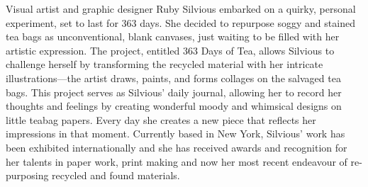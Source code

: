 Visual artist and graphic designer Ruby Silvious embarked on a quirky, personal experiment, set to last for 363 days. She decided to repurpose soggy and stained tea bags as unconventional, blank canvases, just waiting to be filled with her artistic expression. The project, entitled 363 Days of Tea, allows Silvious to challenge herself by transforming the recycled material with her intricate illustrations—the artist draws, paints, and forms collages on the salvaged tea bags. This project serves as Silvious’ daily journal, allowing her to record her thoughts and feelings by creating wonderful moody and whimsical designs on little teabag papers. Every day she creates a new piece that reflects her impressions in that moment. Currently based in New York, Silvious’ work has been exhibited internationally and she has received awards and recognition for her talents in paper work, print making and now her most recent endeavour of re-purposing recycled and found materials.


